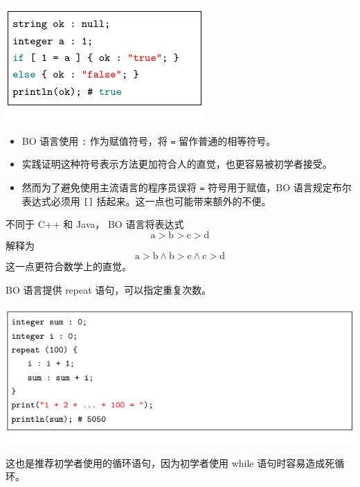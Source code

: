 \documentclass[dvipsnames, svgnames, x11names]{beamer}
\begin{document}
\begin{frame}

    \begin{minipage}{.45\linewidth}
    \onslide<+-> \includegraphics{../figure/characteristic3.pdf}
    \end{minipage}
    \begin{minipage}{.5\linewidth}
    \begin{itemize}[<+->]
        \item BO 语言使用 \texttt{:} 作为赋值符号，将 \texttt{=} 留作普通的相等符号。
        \item 实践证明这种符号表示方法更加符合人的直觉，也更容易被初学者接受。
        \item 然而为了避免使用主流语言的程序员误将 \texttt{=} 符号用于赋值，BO 语言规定布尔表达式必须用 \texttt{[]} 括起来。这一点也可能带来额外的不便。
    \end{itemize}
    \end{minipage}
\end{frame}

\begin{frame}
    不同于 C++ 和 Java， BO 语言将表达式
    \[
        \text{a} > \text{b} > \text{c} > \text{d}
    \]
    解释为
    \[
        \text{a} > \text{b} \land \text{b} > \text{c} \land \text{c} > \text{d}
    \]
    这一点更符合数学上的直觉。
\end{frame}

\begin{frame}

    \onslide<+-> BO 语言提供 repeat 语句，可以指定重复次数。

    \begin{center}
    \onslide<+-> \includegraphics{../figure/characteristic1.pdf}
    \end{center}

    \onslide<+-> 这也是推荐初学者使用的循环语句，因为初学者使用 while 语句时容易造成死循环。
\end{frame}
\end{document}

